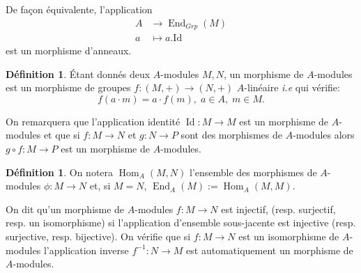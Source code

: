 \documentclass[a4paper, oneside, 12pt]{book}
\theoremstyle{theoremeStyle} %
\theoremstyle{definition} %
\newtheorem{definition}[theoreme]{Définition}
\DeclareMathOperator{\SEnd}{End}
\DeclareMathOperator{\SHom}{Hom}
\DeclareMathOperator{\Id}{Id}
\begin{document}
De façon équivalente, l'application \begin{align*} A &\to \SEnd_{Grp}(M) \\ a &\mapsto a.\mathrm{Id}\end{align*} est un morphisme d'anneaux.

\begin{definition}Étant donnés deux  $A$-modules $M,N$, un morphisme de $A$-modules est un morphisme de groupes $f:(M,+)\rightarrow (N,+)$   $A$-linéaire \textit{i.e} qui vérifie:
  $$f(a\cdot m)=a\cdot f(m),\; a\in A,\; m\in M.$$
\end{definition}

On remarquera que l'application identité $\Id:M\rightarrow M$ est un morphisme de $A$-modules et que si $f:M\rightarrow N$ et $g:N\rightarrow P$ sont des morphismes de $A$-modules alors $g\circ f:M\rightarrow P$ est un morphisme de $A$-modules.
\begin{definition}On notera $\SHom_A(M,N)$ l'ensemble des morphismes de $A$-modules $\phi:M\rightarrow N$ et, si $M=N$, $\SEnd_A(M):=\SHom_A(M,M)$.\end{definition}

 On dit qu'un morphisme de $A$-modules $f:M\rightarrow N$ est injectif, (resp. surjectif, resp. un isomorphisme) si l'application d'ensemble sous-jacente est injective (resp. surjective, resp. bijective). On vérifie que si   $f:M\rightarrow N$ est un isomorphisme de $A$-modules l'application inverse $f^{-1}:N\rightarrow M$ est automatiquement un morphisme de $A$-modules.
\end{document}
